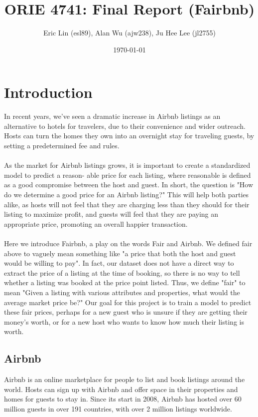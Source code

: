 \documentclass{article}
\title{ORIE 4741: Final Report (Fairbnb)}
\author{Eric Lin (esl89), Alan Wu (ajw238), Ju Hee Lee (jl2755)}
\date{\today}
\begin{document}
\maketitle

\section{Introduction}

In recent years, we’ve seen a dramatic increase in Airbnb listings as an alternative to hotels for travelers, due to their convenience and wider outreach. Hosts can turn the homes they own into an overnight stay for traveling guests, by setting a predetermined fee and rules.
\\ \\
As the market for Airbnb listings grows, it is important to create a standardized model to predict a reason- able price for each listing, where reasonable is defined as a good compromise between the host and guest. In short, the question is "How do we determine a good price for an Airbnb listing?" This will help both parties alike, as hosts will not feel that they are charging less than they should for their listing to maximize profit, and guests will feel that they are paying an appropriate price, promoting an overall happier transaction.
\\ \\
Here we introduce Fairbnb, a play on the words Fair and Airbnb. We defined fair above to vaguely mean something like "a price that both the host and guest would be willing to pay". In fact, our dataset does not have a direct way to extract the price of a listing at the time of booking, so there is no way to tell whether a listing was booked at the price point listed. Thus, we define "fair" to mean "Given a listing with various attributes and properties, what would the average market price be?" Our goal for this project is to train a model to predict these fair prices, perhaps for a new guest who is unsure if they are getting their money's worth, or for a new host who wants to know how much their listing is worth.

\subsection{Airbnb}
Airbnb is an online marketplace for people to list and book listings around the world. Hosts can sign up with Airbnb and offer space in their properties and homes for guests to stay in. Since its start in 2008, Airbnb has hosted over 60 million guests in over 191 countries, with over 2 million listings worldwide. 
\end{document}
